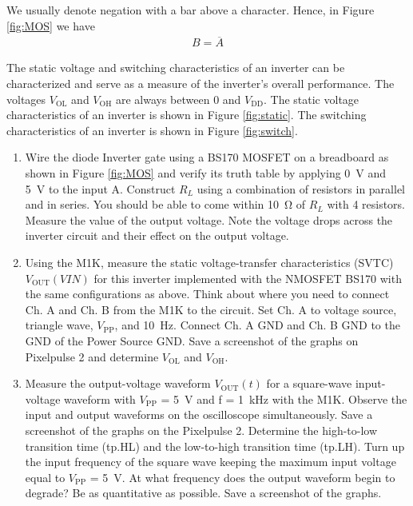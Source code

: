 \documentclass[12pt]{../manual}
\begin{document}
We usually denote negation with a bar above a character. Hence, in Figure \ref{fig:MOS} we have 
\begin{align}
B = \overline{A}
\end{align}

The static voltage and switching characteristics of an inverter can be characterized and serve as a measure of the inverter's overall performance. The voltages $V_\mathrm{OL}$ and $V_\mathrm{OH}$ are always between 0 and $V_\mathrm{DD}$. The static voltage characteristics of an inverter is shown in Figure \ref{fig:static}. The switching characteristics of an inverter is shown in Figure \ref{fig:switch}.

\begin{enumerate}
\item Wire the diode Inverter gate using a BS170 MOSFET on a breadboard as shown in Figure \ref{fig:MOS} and verify its truth table by applying \SI{0}{\volt} and \SI{5}{\volt} to the input A. Construct $R_{L}$ using a combination of resistors in parallel and in series. You should be able to come within \SI{10}{\ohm} of $R_L$ with 4 resistors. Measure the value of the output voltage. Note the voltage drops across the inverter circuit and their effect on the output voltage.
\item Using the M1K, measure the static voltage-transfer characteristics (SVTC)
$V_\mathrm{OUT}(VIN)$ for this inverter implemented with the NMOSFET BS170 with the same configurations as above. Think about where you need to connect Ch. A and Ch. B from the M1K to the circuit. Set Ch. A to voltage source, triangle wave, $V_\mathrm{PP}$, and \SI{10}{\hertz}. Connect Ch. A GND and Ch. B GND to the GND of the Power Source GND. Save a screenshot of the graphs on Pixelpulse 2 and determine $V_\mathrm{OL}$ and $V_\mathrm{OH}$.
\item Measure the output-voltage waveform $V_\mathrm{OUT}(t)$ for a square-wave input-voltage waveform with $V_\mathrm{PP}$ = \SI{5}{\volt} and f = \SI{1}{\kilo\hertz} with the M1K. Observe the input and output waveforms on the oscilloscope simultaneously. Save a screenshot of the graphs on the Pixelpulse 2. Determine the high-to-low transition time (tp.HL) and the low-to-high transition time (tp.LH). Turn up the input frequency of the square wave keeping the maximum input voltage equal to $V_\mathrm{PP}$ = \SI{5}{\volt}. At what frequency does the output waveform begin to degrade? Be as quantitative
as possible. Save a screenshot of the graphs.
\end{enumerate}
\end{document}
